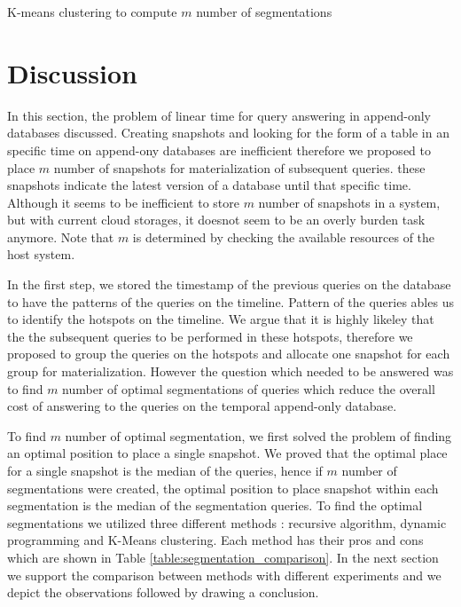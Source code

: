 \begin{algorithm}[H]
\SetAlgoLined
\caption{K-means clustering to compute $m$ number of segmentations}
\label{alg:Kmeans}
\DontPrintSemicolon
\end{algorithm}
\section{Discussion}
In this section, the problem of linear time for query answering in append-only databases discussed. Creating snapshots and looking for the form of a table in an specific time on append-ony databases are inefficient therefore we proposed to place $m$ number of snapshots for materialization of subsequent queries. these snapshots indicate the latest version of a database until that specific time. Although it seems to be inefficient to store $m$ number of snapshots in a system, but with current cloud storages, it doesnot seem to be an overly burden task anymore. Note that $m$ is determined by checking the available resources of the host system.

In the first step, we stored the timestamp of the previous queries on the database to have the patterns of the queries on the timeline. Pattern of the queries ables us to identify the hotspots on the timeline. We argue that it is highly likeley that the the subsequent queries to be performed in these hotspots, therefore we proposed to group the queries on the hotspots and allocate one snapshot for each group for materialization. However the question which needed to be answered was to find $m$ number of optimal segmentations of queries which reduce the overall cost of answering to the queries on the temporal append-only database.

To find $m$ number of optimal segmentation, we first solved the problem of finding an optimal position to place a single snapshot. We proved that the optimal place for a single snapshot is the median of the queries, hence if $m$ number of segmentations were created, the optimal position to place snapshot within each segmentation is the median of the segmentation queries. To find the optimal segmentations we utilized three different methods : recursive algorithm, dynamic programming and K-Means clustering. Each method has their pros and cons which are shown in Table \ref{table:segmentation_comparison}. In the next section we support the comparison between methods with different experiments and we depict the observations followed by drawing a conclusion. 

